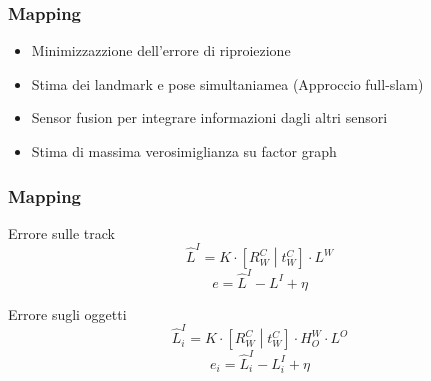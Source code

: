\documentclass[c]{beamer}
\begin{document}

\begin{frame}
\frametitle{Mapping}

\begin{itemize}
 \item Minimizzazzione dell'errore di riproiezione
 \item Stima dei landmark e pose simultaniamea (Approccio full-slam)
 \item Sensor fusion per integrare informazioni dagli altri sensori
 \item Stima di massima verosimiglianza su factor graph
\end{itemize}


\end{frame}


\begin{frame}
\frametitle{Mapping}

\begin{block}{Errore sulle track}
 \begin{equation*}
  \hat{L}^I =  K\cdot \left[  R^C_W \middle| t^C_W  \right] \cdot L^W
 \end{equation*}
 \begin{equation*}
  e = \hat{L}^I - L^I + \eta
 \end{equation*}
\end{block}
\vskip 1cm
\begin{block}{Errore sugli oggetti}
 \begin{equation*}
  \hat{L}^I_i =  K\cdot \left[  R^C_W \middle| t^C_W  \right] \cdot H^W_O \cdot L^O
 \end{equation*}
 \begin{equation*}
  e_i = \hat{L}^I_i - L^I_i + \eta
 \end{equation*}
\end{block}



\end{frame}
\end{document}
